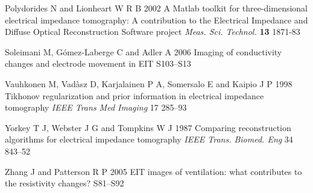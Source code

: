 \documentclass[12pt]{iopart}
\begin{document}
\item[]
Polydorides N and Lionheart W R B 2002 A Matlab toolkit for
three-dimensional electrical impedance tomography: A contribution
to the Electrical Impedance and Diffuse Optical Reconstruction
Software project {\em Meas. Sci. Technol.} {\bf 13} 1871-83


\item[]
Soleimani M, G\'omez-Laberge C and Adler A 2006 Imaging of
conductivity changes and electrode movement in EIT 
S103--S13

\item[]
Vauhkonen M, Vad\`asz D, Karjalainen P A, Somersalo E and
Kaipio J P 1998
 Tikhonov regularization and prior information in
electrical impedance tomography
 {\em IEEE Trans Med Imaging}
17 285--93

\item[]
Yorkey T J, Webster J G and Tompkins W J 1987
Comparing reconstruction algorithms for electrical
impedance tomography
{\em IEEE Trans. Biomed. Eng}
34 843--52

\item[]
Zhang J and Patterson R P 2005 EIT images of ventilation: what
contributes to the resistivity changes?  S81--S92

\endrefs
\end{document}

